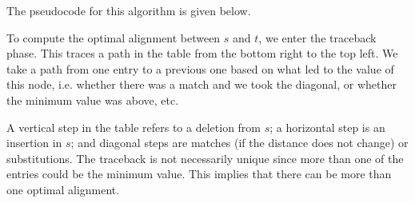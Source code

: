 \documentclass[a4paper, openany]{memoir}
\begin{document}
The pseudocode for this algorithm is given below.


To compute the optimal alignment between $s$ and $t$, we enter the traceback phase. This traces a path in the table from the bottom right to the top left. We take a path from one entry to a previous one based on what led to the value of this node, i.e. whether there was a match and we took the diagonal, or whether the minimum value was above, etc.

A vertical step in the table refers to a deletion from $s$; a horizontal step is an insertion in $s$; and diagonal steps are matches (if the distance does not change) or substitutions. The traceback is not necessarily unique since more than one of the entries could be the minimum value. This implies that there can be more than one optimal alignment.
\end{document}
